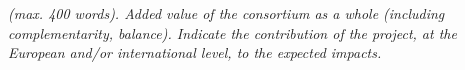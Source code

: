 % 
%
%
%

\emph{(max. 400 words). Added value of the consortium as a whole (including
  complementarity, balance). Indicate the contribution of the project, at the
  European and/or international level, to the expected impacts.} 





% 
